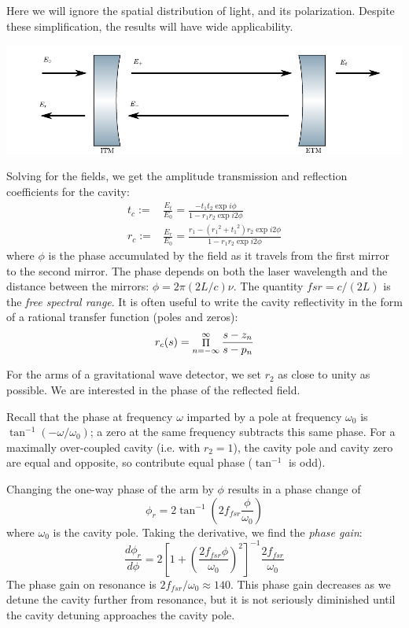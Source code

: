 Here we will ignore the spatial distribution of light, and its
polarization.  Despite these simplification, the results will have
wide applicability.

\includegraphics[]{figures/cavity.pdf}

Solving for the fields, we get the amplitude transmission and
reflection coefficients for the cavity:
%
\begin{align}
t_c := & \frac{E_t}{E_0} = 
         \frac{-t_1 t_2 \exp i\phi}
              {1 - r_1 r_2 \exp i2\phi} \\
r_c := & \frac{E_r}{E_0} = 
         \frac{r_1 - \left({r_1}^2 + {t_1}^2\right)r_2 \exp{i2\phi}}
              {1 - r_1 r_2 \exp i2\phi}
\label{eq:cavity-reflectivity}
\end{align}
%
where $\phi$ is the phase accumulated by the field as it travels from
the first mirror to the second mirror.  The phase depends on both the
laser wavelength and the distance between the mirrors:
$\phi=2\pi(2L/c)\nu$.  The quantity $fsr=c/(2L)$ is the \emph{free
  spectral range}.  It is often useful to write the cavity
reflectivity in the form of a rational transfer function (poles and
zeros):
%
\begin{equation}
r_c(s) = \mathop{\Huge{\Pi}}\limits_{n=-\infty}^{\infty} \frac {s-z_n} {s-p_n}
\end{equation}

For the arms of a gravitational wave detector, we set $r_2$ as close
to unity as possible.  We are interested in the phase of the reflected
field. 
 
Recall that the phase at frequency $\omega$ imparted by a pole at
frequency $\omega_0$ is $\tan^{-1}\left(-\omega/\omega_0\right)$; a
zero at the same frequency subtracts this same phase.  For a maximally
over-coupled cavity (i.e. with $r_2 = 1$), the cavity pole and cavity
zero are equal and opposite, so contribute equal phase ($\tan^{-1}$ is odd).

Changing the one-way phase of the arm by $\phi$ results in a phase 
change of
\begin{equation}
\phi_r = 2 \tan^{-1} \left( 2 f_{fsr} \frac{\phi}{\omega_0} \right)
\end{equation}
where $\omega_0$ is the cavity pole.  Taking the derivative, we find the \emph{phase gain}:
\begin{equation}
  \frac{d \phi_r}{d \phi} = 2 \left[1 + \left(\frac{2 f_{fsr} \phi}{\omega_0}\right)^2 \right]^{-1} \frac{2 f_{fsr}}{\omega_0}
\end{equation}
The phase gain on resonance is $2 f_{fsr} / \omega_0 \approx 140$. This phase gain decreases as we detune the cavity further from resonance, but it is not seriously diminished until the cavity detuning approaches the cavity pole.

